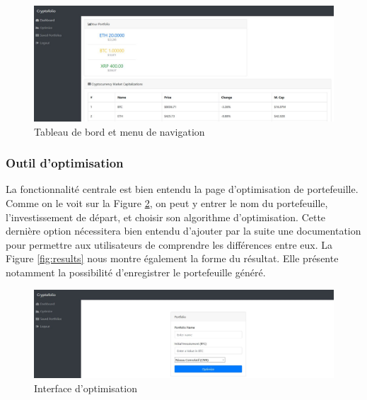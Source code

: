 \documentclass[a4paper, 10pt]{article}
\begin{document}
\begin{figure}[ht!]
\begin{center}
\includegraphics[width=1.0\textwidth]{images/dashboard.JPG}
\caption{Tableau de bord et menu de navigation}
\label{fig:dashboard}
\end{center}
\end{figure}

\subsubsection{Outil d'optimisation}
\label{sec:developpement_pages_optimize}

La fonctionnalité centrale est bien entendu la page d'optimisation de portefeuille. Comme on le voit sur la Figure \ref{fig:optimize}, on peut y entrer le nom du portefeuille, l'investissement de départ, et choisir son algorithme d'optimisation. Cette dernière option nécessitera bien entendu d'ajouter par la suite une documentation pour permettre aux utilisateurs de comprendre les différences entre eux.
La Figure \ref{fig:results} nous montre également la forme du résultat. Elle présente notamment la possibilité d'enregistrer le portefeuille généré.

\begin{figure}[ht!]
\begin{center}
\includegraphics[width=1.0\textwidth]{images/optimize.JPG}
\caption{Interface d'optimisation}
\label{fig:optimize}
\end{center}
\end{figure}
\end{document}

